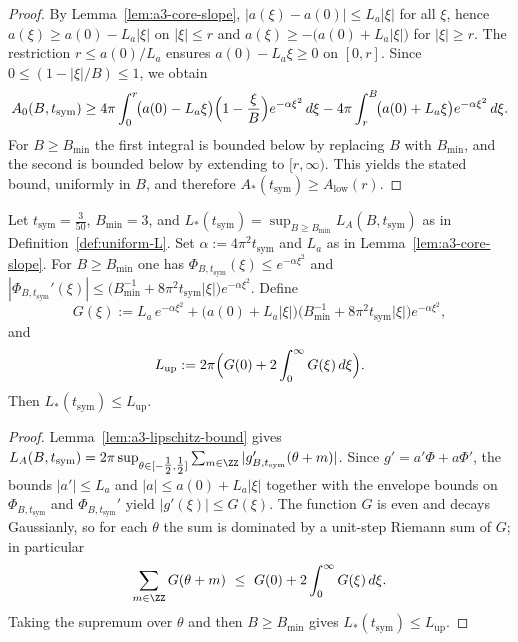 \begin{proof}
By Lemma~\ref{lem:a3-core-slope}, $|a(\xi)-a(0)|\le L_a|\xi|$ for all $\xi$, hence
$a(\xi)\ge a(0)-L_a|\xi|$ on $|\xi|\le r$ and $a(\xi)\ge -\bigl(a(0)+L_a|\xi|\bigr)$ for $|\xi|\ge r$.
The restriction $r\le a(0)/L_a$ ensures $a(0)-L_a\xi\ge0$ on $[0,r]$. Since $0\le (1-|\xi|/B)\le 1$, we obtain
\[
  A_0(B,t_{\mathrm{sym}})
  \ge 4\pi\int_{0}^{r}\!\bigl(a(0)-L_a\xi\bigr)\Bigl(1-\frac{\xi}{B}\Bigr)e^{-\alpha \xi^2}\,d\xi
     - 4\pi\int_{r}^{B}\!\bigl(a(0)+L_a\xi\bigr)e^{-\alpha \xi^2}\,d\xi.
\]
For $B\ge B_{\min}$ the first integral is bounded below by replacing $B$ with $B_{\min}$,
and the second is bounded below by extending to $[r,\infty)$. This yields the stated bound,
uniformly in $B$, and therefore $A_*(t_{\mathrm{sym}})\ge A_{\mathrm{low}}(r)$.
\end{proof}

\begin{lemma}\label{lem:digamma-lip-bound}
Let $t_{\mathrm{sym}}=\frac{3}{50}$, $B_{\min}=3$, and $L_*(t_{\mathrm{sym}})=\sup_{B\ge B_{\min}} L_A(B,t_{\mathrm{sym}})$ as in Definition~\ref{def:uniform-L}.
Set $\alpha:=4\pi^2 t_{\mathrm{sym}}$ and $L_a$ as in Lemma~\ref{lem:a3-core-slope}. For $B\ge B_{\min}$ one has
$\Phi_{B,t_{\mathrm{sym}}}(\xi)\le e^{-\alpha\xi^2}$ and
$
|\Phi_{B,t_{\mathrm{sym}}}'(\xi)|
\le \bigl(B_{\min}^{-1}+8\pi^2 t_{\mathrm{sym}}|\xi|\bigr)e^{-\alpha\xi^2}.
$
Define
\[
  G(\xi)
  := L_a\,e^{-\alpha\xi^2}
     + \bigl(a(0)+L_a|\xi|\bigr)\bigl(B_{\min}^{-1}+8\pi^2 t_{\mathrm{sym}}|\xi|\bigr)e^{-\alpha\xi^2},
\]
and
\[
  L_{\mathrm{up}}
  := 2\pi\Bigl(G(0) + 2\int_{0}^{\infty} G(\xi)\,d\xi\Bigr).
\]
Then $L_*(t_{\mathrm{sym}})\le L_{\mathrm{up}}$.
\end{lemma}

\begin{proof}
Lemma~\ref{lem:a3-lipschitz-bound} gives
$L_A(B,t_{\mathrm{sym}})=2\pi\sup_{\theta\in[-\tfrac12,\tfrac12]}\sum_{m\in\ZZ}|g_{B,t_{\mathrm{sym}}}'(\theta+m)|$.
Since $g'=a'\Phi+a\Phi'$, the bounds $|a'|\le L_a$ and $|a|\le a(0)+L_a|\xi|$ together with the
envelope bounds on $\Phi_{B,t_{\mathrm{sym}}}$ and $\Phi_{B,t_{\mathrm{sym}}}'$ yield $|g'(\xi)|\le G(\xi)$.
The function $G$ is even and decays Gaussianly, so for each $\theta$
the sum is dominated by a unit-step Riemann sum of $G$; in particular
\[
  \sum_{m\in\ZZ} G(\theta+m)\ \le\ G(0) + 2\int_{0}^{\infty} G(\xi)\,d\xi.
\]
Taking the supremum over $\theta$ and then $B\ge B_{\min}$ gives $L_*(t_{\mathrm{sym}})\le L_{\mathrm{up}}$.
\end{proof}

